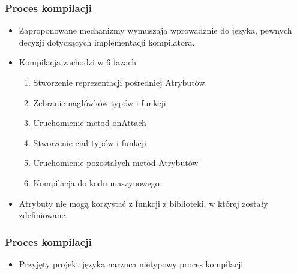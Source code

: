 \begin{frame}
	\frametitle{Proces kompilacji}

	\begin{itemize}
		\item Zaproponowane mechanizmy wymuszają wprowadznie do języka, pewnych decyzji dotyczących implementacji kompilatora.
		\item Kompilacja zachodzi w 6 fazach\begin{enumerate}
			\item Stworzenie reprezentacji pośredniej Atrybutów
			\item Zebranie nagłówków typów i funkcji
			\item Uruchomienie metod onAttach
			\item Stworzenie ciał typów i funkcji
			\item Uruchomienie pozostałych metod Atrybutów
			\item Kompilacja do kodu maszynowego
		\end{enumerate}
		\item Atrybuty nie mogą korzystać z funkcji z biblioteki, w której zostały zdefiniowane.
	\end{itemize}

\end{frame}

\begin{frame}
	\frametitle{Proces kompilacji}

	\begin{itemize}
		\item Przyjęty projekt języka narzuca nietypowy proces kompilacji
	\end{itemize}

\end{frame}

